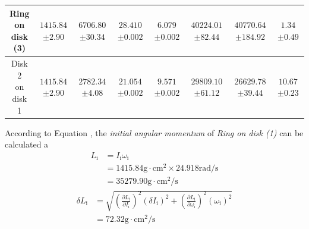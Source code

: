\begin{center}
\begin{tabular}{|c|c|c|c|c|c|c|c|}
    \hline
    \makecell{Ring             \\on disk\\(3)} & \makecell{$1415.84$ \\$\pm2.90$} &    \makecell{$6706.80$\\$\pm30.34$}& \makecell{$28.410$\\$\pm0.002$} &    \makecell{$6.079$\\$\pm0.002$} & \makecell{$40224.01$\\$\pm82.44$} &   \makecell{$40770.64$\\$\pm184.92$} & \makecell{$1.34$\\$\pm0.49$} \\
    \hline
    \makecell{Disk 2           \\on\\disk 1} & \makecell{$1415.84$ \\$\pm2.90$} &    \makecell{$2782.34$\\$\pm4.08$}& \makecell{$21.054$\\$\pm0.002$} & \makecell   {$9.571$\\$\pm0.002$} & \makecell{$29809.10$\\$\pm61.12$} & \makecell {$26629.78$\\$\pm39.44$} & \makecell{$10.67$\\$\pm0.23$} \\
    \hline
  \end{tabular}
  \label{tab:AngMomentum}
\end{center}
According to Equation , the \emph{initial angular momentum} of \emph{Ring on disk (1)} can be calculated a
\begin{equation*}
  \begin{aligned}
    L_{\text{i}} & =I_{\text{i}}\omega_{\text{i}}                           \\
                 & =1415.84\text{g}\cdot\text{cm}^2\times24.918\text{rad/s} \\
                 & =35279.90\text{g}\cdot\text{cm}^2\text{/s}
  \end{aligned}
\end{equation*}
\begin{equation*}
  \begin{aligned}
    \delta L_{\text{i}} & =\sqrt{(\frac{\partial L_{\text{i}}}{\partial I_{\text{i}}})^2(\delta I_{\text{i}})^2+(\frac{\partial L_{\text{i}}}{\partial \omega_{\text{i}}})^2(\omega_{\text{i}})^2} \\
                        & =72.32\text{g}\cdot\text{cm}^2\text{/s}
  \end{aligned}
\end{equation*}
